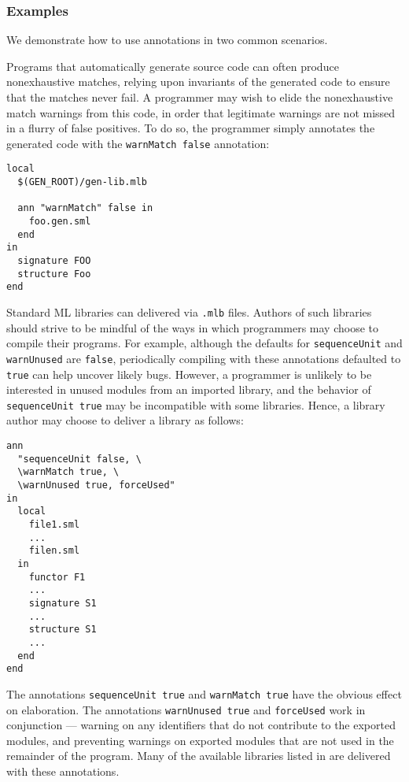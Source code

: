 %
\subsubsection{Examples}

We demonstrate how to use annotations in two common scenarios.

Programs that automatically generate source code can often produce
nonexhaustive matches, relying upon invariants of the generated code
to ensure that the matches never fail.  A programmer may wish to elide
the nonexhaustive match warnings from this code, in order that
legitimate warnings are not missed in a flurry of false positives.  To
do so, the programmer simply annotates the generated code with the
{\tt warnMatch false} annotation:
\begin{verbatim}
local
  $(GEN_ROOT)/gen-lib.mlb

  ann "warnMatch" false in
    foo.gen.sml
  end
in
  signature FOO
  structure Foo
end
\end{verbatim}

Standard ML libraries can delivered via {\tt .mlb} files.  Authors of
such libraries should strive to be mindful of the ways in which
programmers may choose to compile their programs.  For example,
although the defaults for {\tt sequenceUnit} and {\tt warnUnused} are
{\tt false}, periodically compiling with these annotations defaulted
to {\tt true} can help uncover likely bugs.  However, a programmer is
unlikely to be interested in unused modules from an imported library,
and the behavior of {\tt sequenceUnit true} may be incompatible with
some libraries.  Hence, a library author may choose to deliver a
library as follows:
\begin{verbatim}
ann 
  "sequenceUnit false, \
  \warnMatch true, \
  \warnUnused true, forceUsed"
in
  local
    file1.sml
    ...
    filen.sml
  in
    functor F1
    ...
    signature S1
    ...
    structure S1
    ...
  end
end
\end{verbatim}
The annotations {\tt sequenceUnit true} and {\tt warnMatch true} have
the obvious effect on elaboration.  The annotations {\tt warnUnused
true} and {\tt forceUsed} work in conjunction --- warning on any
identifiers that do not contribute to the exported modules, and
preventing warnings on exported modules that are not used in the
remainder of the program.  Many of the available libraries listed in
\secref{mlb-libs} are delivered with these annotations.
